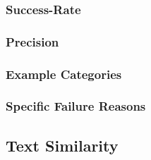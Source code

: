 \documentclass[\myrootdir/main.tex]{subfiles}
\begin{document}
\subsubsection{Success-Rate}
\subsubsection{Precision}
\subsubsection{Example Categories}
\subsubsection{Specific Failure Reasons}


\subsection{Text Similarity}
\end{document}
